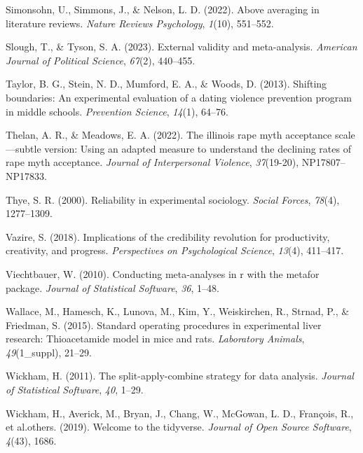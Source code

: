 \documentclass[
  man]{apa6}
\newlength{\cslhangindent}
\newenvironment{CSLReferences}[2] %
 {\begin{list}{}{%
  \setlength{\itemindent}{0pt}
  \setlength{\leftmargin}{0pt}
  \setlength{\parsep}{0pt}
  \ifodd #1
   \setlength{\leftmargin}{\cslhangindent}
   \setlength{\itemindent}{-1\cslhangindent}
  \fi
  \setlength{\itemsep}{#2\baselineskip}}}
 {\end{list}}
\begin{document}
\begin{CSLReferences}{1}{0}
Simonsohn, U., Simmons, J., \& Nelson, L. D. (2022). Above averaging in literature reviews. \emph{Nature Reviews Psychology}, \emph{1}(10), 551--552.

Slough, T., \& Tyson, S. A. (2023). External validity and meta-analysis. \emph{American Journal of Political Science}, \emph{67}(2), 440--455.

Taylor, B. G., Stein, N. D., Mumford, E. A., \& Woods, D. (2013). Shifting boundaries: An experimental evaluation of a dating violence prevention program in middle schools. \emph{Prevention Science}, \emph{14}(1), 64--76.

Thelan, A. R., \& Meadows, E. A. (2022). The illinois rape myth acceptance scale---subtle version: Using an adapted measure to understand the declining rates of rape myth acceptance. \emph{Journal of Interpersonal Violence}, \emph{37}(19-20), NP17807--NP17833.

Thye, S. R. (2000). Reliability in experimental sociology. \emph{Social Forces}, \emph{78}(4), 1277--1309.

Vazire, S. (2018). Implications of the credibility revolution for productivity, creativity, and progress. \emph{Perspectives on Psychological Science}, \emph{13}(4), 411--417.

Viechtbauer, W. (2010). Conducting meta-analyses in r with the metafor package. \emph{Journal of Statistical Software}, \emph{36}, 1--48.

Wallace, M., Hamesch, K., Lunova, M., Kim, Y., Weiskirchen, R., Strnad, P., \& Friedman, S. (2015). Standard operating procedures in experimental liver research: Thioacetamide model in mice and rats. \emph{Laboratory Animals}, \emph{49}(1\_suppl), 21--29.

Wickham, H. (2011). The split-apply-combine strategy for data analysis. \emph{Journal of Statistical Software}, \emph{40}, 1--29.

Wickham, H., Averick, M., Bryan, J., Chang, W., McGowan, L. D., François, R., et al.others. (2019). Welcome to the tidyverse. \emph{Journal of Open Source Software}, \emph{4}(43), 1686.

\end{CSLReferences}
\end{document}

